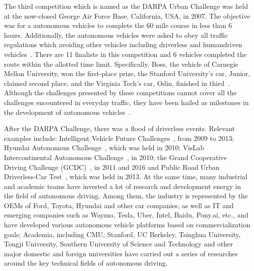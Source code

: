 \documentclass[conference]{IEEEtran}
\begin{document}
The third competition which is named as the DARPA Urban Challenge was held at the now-closed George Air Force Base, California, USA, in 2007. The objective was for a autonomous vehicles to complete the 60 mile course in less than 6 hours. Additionally, the autonomous vehicles were asked to obey all traffic regulations which avoiding other vehicles including driverless and humandriven vehicles~\cite{buehler2009darpa}. There are 11 finalists in this competition and 6 vehicles completed the route within the allotted time limit. Specifically, Boss, the vehicle of Carnegie Mellon University, won the first-place prize, the Stanford University's car, Junior, claimed second place, and the Virginia Tech's car, Odin, finished in third~\cite{buehler2009darpa}. Although the challenges presented by these competitions cannot cover all the challenges encountered in everyday traffic, they have been hailed as milestones in the development of autonomous vehicles~\cite{Brian2016}.

After the DARPA Challenge, there was a flood of driverless events. Relevant examples include: Intelligent Vehicle Future Challenges~\cite{xin2014china}, from 2009 to 2013; Hyundai Autonomous Challenge~\cite{Cerri2011}, which was held in 2010; VisLab Intercontinental Autonomous Challenge~\cite{broggi2012vislab}, in 2010; the Grand Cooperative Driving Challenge (GCDC)~\cite{Englund2016}, in 2011 and 2016 and Public Road Urban Driverless-Car Test~\cite{Broggi2015}, which was held in 2013. At the same time, many industrial and academic teams have invested a lot of research and development energy in the field of autonomous driving. Among them, the industry is represented by the OEMs of Ford, Toyota, Hyundai and other car companies, as well as IT and emerging companies such as Waymo, Tesla, Uber, Intel, Baidu, Pony.ai, etc., and have developed various autonomous vehicle platforms based on commercialization goals; Academia, including CMU, Stanford, UC Berkeley, Tsinghua University, Tongji University, Southern University of Science and Technology and other major domestic and foreign universities have carried out a series of researches around the key technical fields of autonomous driving.
\end{document}
